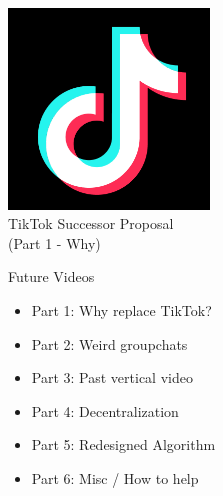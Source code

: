 \documentclass[aspectratio=35]{beamer} %
\begin{document}
\begin{frame}
\centering
\vspace{-1in}
\includegraphics[width=0.4\textwidth]{imgs/app_icons/tiktok-icon2.png}\\
TikTok Successor Proposal \\
(Part 1 - Why)
\end{frame}

\begin{frame}{Future Videos}
\centering
\tiny
\vspace{-1.5in}
\begin{itemize}
    \item Part 1: Why replace TikTok?
    \item Part 2: Weird groupchats 
    \item Part 3: Past vertical video
    \item Part 4: Decentralization
    \item Part 5: Redesigned Algorithm
    \item Part 6: Misc / How to help
\end{itemize}
\end{frame}
\end{document}
